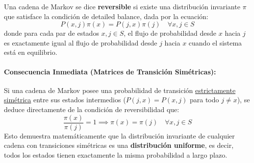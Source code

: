 \begin{definicion}
    Una cadena de Markov se dice \textbf{reversible} si existe una distribución invariante $\pi$ que satisface la condición de detailed balance, dada por la ecuación:
    \begin{equation*}
        P(x, j)\pi(x) = P(j, x)\pi(j) \quad \forall x, j \in S
    \end{equation*}
    donde para cada par de estados $x, j \in S$, el flujo de probabilidad desde $x$ hacia $j$ es exactamente igual al flujo de probabilidad desde $j$ hacia $x$ cuando el sistema está en equilibrio.
\end{definicion}

\paragraph{Consecuencia Inmediata (Matrices de Transición Simétricas):}
Si una cadena de Markov posee una probabilidad de transición \underline{estrictamente simétrica} entre sus estados intermedios ($P(j, x) = P(x, j)$ para todo $j \neq x$), se deduce directamente de la condición de reversibilidad que:
\begin{equation*}
    \frac{\pi(x)}{\pi(j)} = 1 \implies \pi(x) = \pi(j) \quad \forall x, j \in S
\end{equation*}
Esto demuestra matemáticamente que la distribución invariante de cualquier cadena con transiciones simétricas es una \textbf{distribución uniforme}, es decir, todos los estados tienen exactamente la misma probabilidad a largo plazo.

